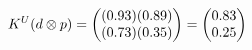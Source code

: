 \documentclass[preview]{standalone}
\begin{document}
\begin{align*}
\special{dvisvgm:raw <g id='unique000'>}K^U(d \otimes p) = \begin{pmatrix} (0.93)(0.89) \\ (0.73)(0.35) \end{pmatrix} = \begin{pmatrix} 0.83 \\ 0.25 \end{pmatrix}\special{dvisvgm:raw </g>}
\end{align*}
\end{document}
